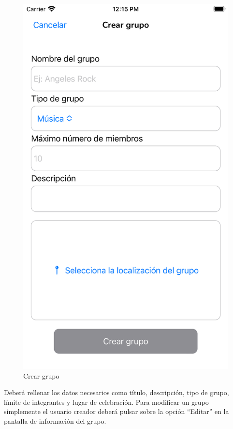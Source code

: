 \begin{appendices}
\begin{figure}[H]
\begin{minipage}{0.3\textwidth}
        \end{minipage}
        \begin{minipage}{0.3\textwidth}
            \centering
            \includegraphics[cframe=black 2pt,width=1\linewidth]{images/manual/crearGrupo.png}
        \end{minipage}
        \caption{Crear grupo}
        \label{fig:create_group}
\end{figure}
Deberá rellenar los datos necesarios como título, descripción, tipo de grupo, límite de integrantes y lugar de celebración.
Para modificar un grupo simplemente el usuario creador deberá pulsar sobre la opción ``Editar'' en la pantalla de información del grupo.


\end{appendices}
